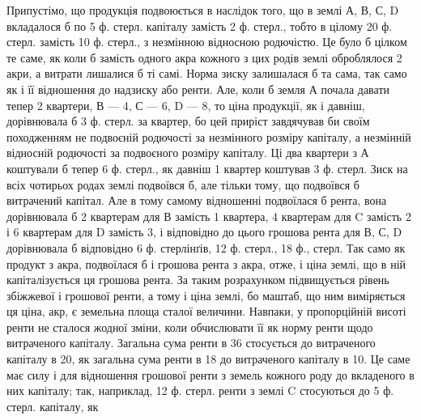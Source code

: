 Припустімо, що продукція подвоюється в наслідок того, що в землі А,
В, С, D вкладалося б по 5 ф. стерл. капіталу замість 2 ф. стерл., тобто
в цілому 20 ф. стерл. замість 10 ф. стерл., з незмінною відносною родючістю.
Це було б цілком те саме, як коли б замість одного акра кожного з цих
родів землі оброблялося 2 акри, а витрати лишалися б ті самі. Норма зиску
залишалася б та сама, так само як і її відношення до надзиску або ренти. Але,
коли б земля А почала давати тепер 2 квартери, В — 4, С — 6, D — 8, то ціна
продукції, як і давніш, дорівнювала б 3 ф. стерл. за квартер, бо цей приріст
завдячував би своїм походженням не подвоєній родючості за незмінного розміру
капіталу, а незмінній відносній родючості за подвоєного розміру капіталу. Ці
два квартери з А коштували б тепер 6 ф. стерл., як давніш 1 квартер коштував
3 ф. стерл. Зиск на всіх чотирьох родах землі подвоївся б, але тільки
тому, що подвоївся б витрачений капітал. Але в тому самому відношенні подвоїлася
б рента, вона дорівнювала б 2 квартерам для В замість 1 квартера, 4 квартерам
для C замість 2 і 6 квартерам для D замість 3, і відповідно до цього
грошова рента для В, С, D дорівнювала б відповідно 6 ф. стерлінґів, 12 ф.
стерл., 18 ф., стерл. Так само як продукт з акра, подвоїлася б і грошова
рента з акра, отже, і ціна землі, що в ній капіталізується ця грошова рента. За
таким розрахунком підвищується рівень збіжжевої і грошової ренти, а тому і
ціна землі, бо маштаб, що ним виміряється ця ціна, акр, є земельна площа
сталої величини. Навпаки, у пропорційній висоті ренти не сталося жодної зміни,
коли обчислювати її як норму ренти щодо витраченого капіталу. Загальна сума
ренти в 36 стосується до витраченого капіталу в 20, як загальна сума ренти
в 18 до витраченого капіталу в 10. Це саме має силу і для відношення грошової
ренти з земель кожного роду до вкладеного в них капіталу; так, наприклад,
12 ф. стерл. ренти з землі C стосуються до 5 ф. стерл. капіталу, як
\parbreak{}  %
